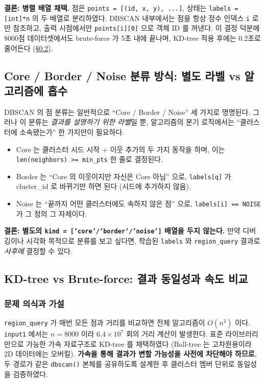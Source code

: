 \documentclass[12pt, a4paper]{article}
\begin{document}
\noindent\textbf{결론: 병렬 배열 채택.} 점은 \texttt{points = [(id, x, y), ...]}, 상태는 \texttt{labels = [int]*n} 의 두 배열로 분리하였다. DBSCAN 내부에서는 점을 항상 정수 인덱스 \texttt{i} 로만 참조하고, 출력 시점에서만 \texttt{points[i][0]} 으로 객체 ID 를 꺼낸다. 이 결정 덕분에 8000점 데이터셋에서도 brute-force 가 5초 내에 끝나며, KD-tree 적용 후에는 0.2초로 줄어든다 (\S\ref{sec:exp-kdtree}).


\subsection{Core / Border / Noise 분류 방식: 별도 라벨 vs 알고리즘에 흡수}

DBSCAN 의 점 분류는 일반적으로 ``Core / Border / Noise'' 세 가지로 명명된다. 그러나 이 분류는 \emph{결과를 설명하기 위한 라벨}일 뿐, 알고리즘의 분기 로직에서는 ``클러스터에 소속됐는가'' 한 가지만이 필요하다.

\begin{itemize}
    \item Core 는 클러스터 시드 시작 + 이웃 추가의 두 가지 동작을 하며, 이는 \texttt{len(neighbors) >= min\_pts} 한 줄로 결정된다.
    \item Border 는 ``Core 의 이웃이지만 자신은 Core 아님'' 으로, \texttt{labels[q]} 가 cluster\_id 로 바뀌기만 하면 된다 (시드에 추가하지 않음).
    \item Noise 는 ``끝까지 어떤 클러스터에도 속하지 않은 점'' 으로, \texttt{labels[i] == NOISE} 가 그 정의 그 자체이다.
\end{itemize}

\noindent\textbf{결론: 별도의 \texttt{kind = ['core'/'border'/'noise']} 배열을 두지 않는다.} 만약 디버깅이나 시각화 목적으로 분류를 보고 싶다면, 학습된 \texttt{labels} 와 \texttt{region\_query} 결과로 \emph{사후에} 결정할 수 있다.


\subsection{KD-tree vs Brute-force: 결과 동일성과 속도 비교}
\label{sec:exp-kdtree}

\subsubsection*{문제 의식과 가설}

\texttt{region\_query} 가 매번 모든 점과 거리를 비교하면 전체 알고리즘이 $O(n^2)$ 이다. \texttt{input1} 에서는 $n=8000$ 이라 $6.4 \times 10^7$ 회의 거리 계산이 발생한다. 표준 라이브러리만으로 가능한 가속 자료구조로 KD-tree 를 채택하였다 (Ball-tree 는 고차원용이라 2D 데이터에는 오버킬). \textbf{가속을 통해 결과가 변할 가능성을 사전에 차단해야 하므로}, 두 경로가 같은 \texttt{dbscan()} 본체를 공유하도록 설계한 후 클러스터 멤버 단위로 동일성을 검증하였다.
\end{document}
